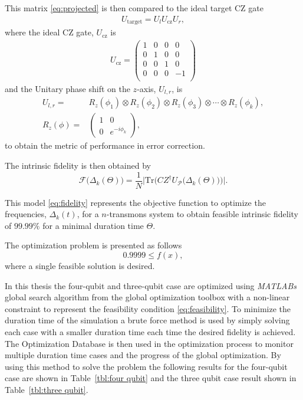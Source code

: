 This matrix \eqref{eq:projected} is then compared to the ideal target CZ gate 
\begin{align}
  \label{eq:ideal}
  U_{\text{target}} = U_l U_{\text{cz}} U_r,
\end{align}
where the ideal CZ gate, $U_{\text{cz}}$ is
\begin{align}
  U_{\text{cz}} = \begin{pmatrix}
                    1 & 0 & 0 & 0 \\
                    0 & 1 & 0 & 0 \\
                    0 & 0 & 1 & 0 \\
                    0 & 0 & 0 & -1 \\
                  \end{pmatrix}
\end{align}
and the Unitary phase shift on the $z$-axis, $U_{l,r}$, is
\begin{align}
  U_{l,r} =& R_z(\phi_1) \otimes R_z(\phi_2) \otimes R_z(\phi_3) \otimes \cdots \otimes R_z(\phi_k),\\
  R_z(\phi) =& \begin{pmatrix} 1 & 0 \\ 0 & e^{-i\phi_k} \end{pmatrix}, 
\end{align}
to obtain the metric of performance in error correction.

The intrinsic fidelity is then obtained by
\begin{equation}
  \label{eq:fidelity}
    \mathscr{F}\big(\Delta_k(\Theta)\big)=\frac{1}{N}\Bigg| \mathrm{Tr}\bigg( CZ^{\dagger} U_\mathscr{P}\big(\Delta_k(\Theta) \big) \bigg) \Bigg|.
\end{equation}

This model \eqref{eq:fidelity} represents the objective function to optimize the frequencies, $\Delta_k(t)$, for a $n$-transmons system to obtain feasible intrinsic fidelity of $99.99\%$ for a minimal duration time $\Theta$.

The optimization problem is presented as follows
\begin{equation}
    \label{eq:feasibility}
    0.9999 \leq f(x),
\end{equation}
where a single feasible solution is desired. 

In this thesis the four-qubit and three-qubit case are optimized using \textit{MATLABs} global search algorithm from the global optimization toolbox with a non-linear constraint to represent the feasibility condition \eqref{eq:feasibility}. To minimize the duration time of the simulation a brute force method is used by simply solving each case with a smaller duration time each time the desired fidelity is achieved. The Optimization Database is then used in the optimization process to
monitor multiple duration time cases and the progress of the global optimization. By using this method to solve the problem the following results for the four-qubit case are shown in Table~\ref{tbl:four qubit} and the three qubit case result shown in Table~\ref{tbl:three qubit}. 

